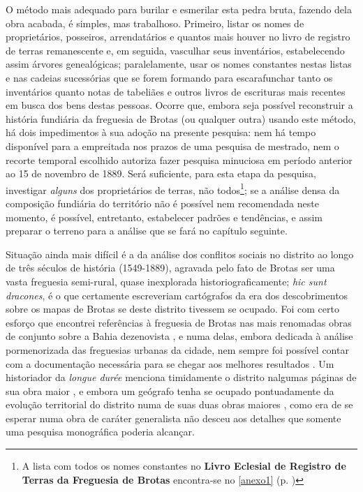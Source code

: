O método mais adequado para burilar e esmerilar esta pedra bruta, fazendo dela obra acabada, é simples, mas trabalhoso. Primeiro, listar os nomes de proprietários, posseiros, arrendatários e quantos mais houver no livro de registro de terras remanescente e, em seguida, vasculhar seus inventários, estabelecendo assim árvores genealógicas; paralelamente, usar os nomes constantes nestas listas e nas cadeias sucessórias que se forem formando para escarafunchar tanto os inventários quanto notas de tabeliães e outros livros de escrituras mais recentes em busca dos bens destas pessoas. Ocorre que, embora seja possível reconstruir a história fundiária da freguesia de Brotas (ou qualquer outra) usando este método, há dois impedimentos à sua adoção na presente pesquisa: nem há tempo disponível para a empreitada nos prazos de uma pesquisa de mestrado, nem o recorte temporal escolhido autoriza fazer pesquisa minuciosa em período anterior ao 15 de novembro de 1889. Será suficiente, para esta etapa da pesquisa, investigar \textit{alguns} dos proprietários de terras, não todos\footnote{A lista com todos os nomes constantes no \textbf{Livro Eclesial de Registro de Terras da Freguesia de Brotas} encontra-se no \autoref{anexo1} (p. \pageref{anexo1})}; se a análise densa da composição fundiária do território não é possível nem recomendada neste momento, é possível, entretanto, estabelecer padrões e tendências, e assim preparar o terreno para a análise que se fará no capítulo seguinte.

Situação ainda mais difícil é a da análise dos conflitos sociais no distrito ao longo de três séculos de história (1549-1889), agravada pelo fato de Brotas ser uma vasta freguesia semi-rural, quase inexplorada historiograficamente; \textit{hic sunt dracones}, é o que certamente escreveriam cartógrafos da era dos descobrimentos sobre os mapas de Brotas se deste distrito tivessem se ocupado. Foi com certo esforço que encontrei referências à freguesia de Brotas nas mais renomadas obras de conjunto sobre a Bahia dezenovista \cite{MATTOSO1978, MATTOSO1992, NASCIMENTO2007}, e numa delas, embora dedicada à análise pormenorizada das freguesias urbanas da cidade, nem sempre foi possível contar com a documentação necessária para se chegar aos melhores resultados \cite{NASCIMENTO2007}. Um historiador da \textit{longue durée} menciona timidamente o distrito nalgumas páginas de sua obra maior \cite{tavares_historia_2008}, e embora um geógrafo tenha se ocupado pontuadamente da evolução territorial do distrito numa de suas duas obras maiores \cite{VASCONCELOS2002}, como era de se esperar numa obra de caráter generalista não desceu aos detalhes que somente uma pesquisa monográfica poderia alcançar. 

